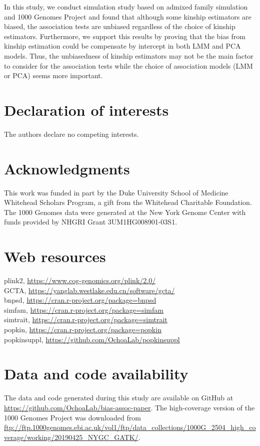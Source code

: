 \documentclass[11pt]{article}
\begin{document}
In this study, we conduct simulation study based on admixed family simulation and 1000 Genomes Project and found that although some kinship estimators are biased, the association tests are unbiased regardless of the choice of kinship estimators. Furthermore, we support this results by proving that the bias from kinship estimation could be compensate by intercept in both LMM and PCA models. Thus, the unbiasedness of kinship estimators may not be the main factor to consider for the association tests while the choice of association models (LMM or PCA) seems more important.


\section*{Declaration of interests}
The authors declare no competing interests.

\section*{Acknowledgments}
This work was funded in part by the Duke University School of Medicine Whitehead Scholars Program, a gift from the Whitehead Charitable Foundation.
The 1000 Genomes data were generated at the New York Genome Center with funds provided by NHGRI Grant 3UM1HG008901-03S1.

\section*{Web resources}
plink2, \url{https://www.cog-genomics.org/plink/2.0/}\\
GCTA, \url{https://yanglab.westlake.edu.cn/software/gcta/}\\
bnpsd, \url{https://cran.r-project.org/package=bnpsd}\\
simfam, \url{https://cran.r-project.org/package=simfam}\\
simtrait, \url{https://cran.r-project.org/package=simtrait}\\
popkin, \url{https://cran.r-project.org/package=popkin}\\
popkinsuppl, \url{https://github.com/OchoaLab/popkinsuppl}

\section*{Data and code availability}
The data and code generated during this study are available on GitHub at \url{https://github.com/OchoaLab/bias-assoc-paper}.
The high-coverage version of the 1000 Genomes Project was downloaded from \url{ftp://ftp.1000genomes.ebi.ac.uk/vol1/ftp/data_collections/1000G_2504_high_coverage/working/20190425_NYGC_GATK/}.
\end{document}
